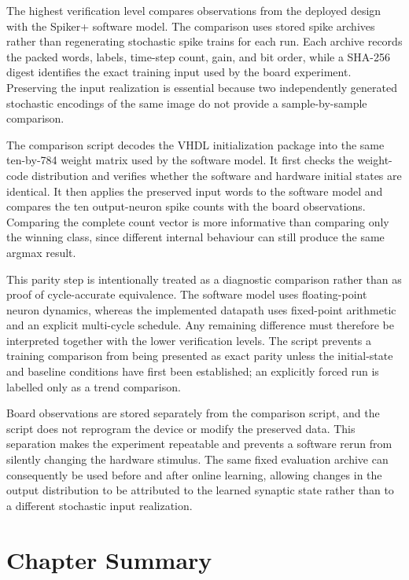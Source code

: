 The highest verification level compares observations from the deployed design with the Spiker+ software model. The comparison uses stored spike archives rather than regenerating stochastic spike trains for each run. Each archive records the packed words, labels, time-step count, gain, and bit order, while a SHA-256 digest identifies the exact training input used by the board experiment. Preserving the input realization is essential because two independently generated stochastic encodings of the same image do not provide a sample-by-sample comparison.

The comparison script decodes the VHDL initialization package into the same ten-by-784 weight matrix used by the software model. It first checks the weight-code distribution and verifies whether the software and hardware initial states are identical. It then applies the preserved input words to the software model and compares the ten output-neuron spike counts with the board observations. Comparing the complete count vector is more informative than comparing only the winning class, since different internal behaviour can still produce the same argmax result.

This parity step is intentionally treated as a diagnostic comparison rather than as proof of cycle-accurate equivalence. The software model uses floating-point neuron dynamics, whereas the implemented datapath uses fixed-point arithmetic and an explicit multi-cycle schedule. Any remaining difference must therefore be interpreted together with the lower verification levels. The script prevents a training comparison from being presented as exact parity unless the initial-state and baseline conditions have first been established; an explicitly forced run is labelled only as a trend comparison.

Board observations are stored separately from the comparison script, and the script does not reprogram the device or modify the preserved data. This separation makes the experiment repeatable and prevents a software rerun from silently changing the hardware stimulus. The same fixed evaluation archive can consequently be used before and after online learning, allowing changes in the output distribution to be attributed to the learned synaptic state rather than to a different stochastic input realization.

\section{Chapter Summary}
\label{subsec:implementation-summary}

